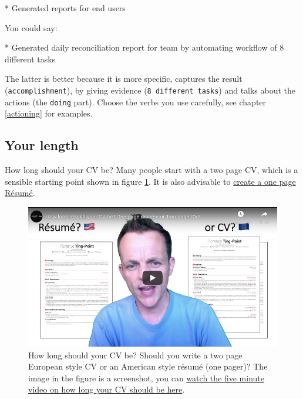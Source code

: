 \documentclass[
]{book}
\newenvironment{Shaded}{\begin{snugshade}}{\end{snugshade}}
\newcommand{\NormalTok}[1]{#1}
\newcommand{\SpecialStringTok}[1]{\textcolor[rgb]{0.31,0.60,0.02}{#1}}
\begin{document}
\begin{Shaded}
\begin{Highlighting}[]
\SpecialStringTok{* }\NormalTok{Generated reports for end users}
\end{Highlighting}
\end{Shaded}

You could say:

\begin{Shaded}
\begin{Highlighting}[]
\SpecialStringTok{* }\NormalTok{Generated daily reconciliation report for team by automating workflow of 8 different tasks}
\end{Highlighting}
\end{Shaded}

The latter is better because it is more specific, captures the result (\texttt{accomplishment}), by giving evidence (\texttt{8\ different\ tasks}) and talks about the actions (the \texttt{doing} part). Choose the verbs you use carefully, see chapter \ref{actioning} for examples.

\hypertarget{length}{%
\subsection{Your length}\label{length}}

How long should your CV be? Many people start with a two page CV, which is a sensible starting point shown in figure \ref{fig:oneortwopager-fig}. It is also advisable to \href{https://www.cv-library.co.uk/career-advice/cv/how-long-cv-be/}{create a one page Résumé}. \citep{howlong}

\begin{figure}

{\centering \includegraphics[width=0.99\linewidth]{images/youtube-resume-or-cv} 

}

\caption{How long should your CV be? Should you write a two page European style CV or an American style résumé (one pager)? \citep{youtube-resume-or-cv} The image in the figure is a screenshot, you can \href{https://www.youtube.com/watch?v=0abDOKHS5T0}{watch the five minute video on how long your CV should be here}.}\label{fig:oneortwopager-fig}
\end{figure}
\end{document}
